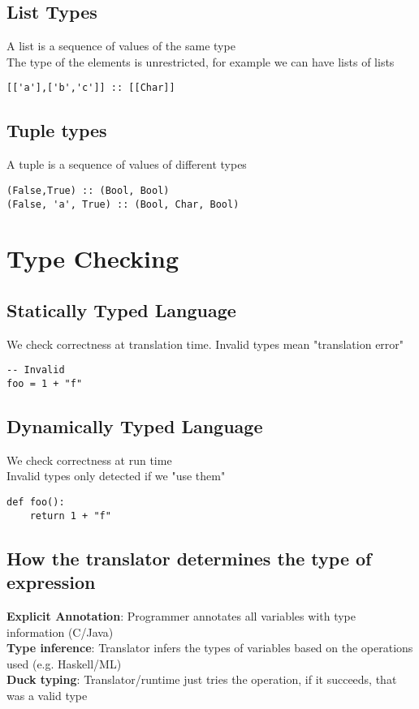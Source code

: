 \documentclass{article}[18pt]
\begin{document}
\subsection{List Types}
A list is a sequence of values of the same type\\
The type of the elements is unrestricted, for example we can have lists of lists
\begin{verbatim}
[['a'],['b','c']] :: [[Char]]
\end{verbatim}
\subsection{Tuple types}
A tuple is a sequence of values of different types
\begin{verbatim}
(False,True) :: (Bool, Bool)
(False, 'a', True) :: (Bool, Char, Bool)
\end{verbatim}
\section{Type Checking}
\subsection{Statically Typed Language}
We check correctness at translation time. Invalid types mean "translation error"
\begin{verbatim}
-- Invalid
foo = 1 + "f"
\end{verbatim}
\subsection{Dynamically Typed Language}
We check correctness at run time\\
Invalid types only detected if we "use them"
\begin{verbatim}
def foo():
	return 1 + "f"
\end{verbatim}
\subsection{How the translator determines the type of expression}
\textbf{Explicit Annotation}:
Programmer annotates all variables with type information (C/Java)\\
\textbf{Type inference}:
Translator infers the types of variables based on the operations used (e.g. Haskell/ML)\\
\textbf{Duck typing}:
Translator/runtime just tries the operation, if it succeeds, that was a valid type
\end{document}
